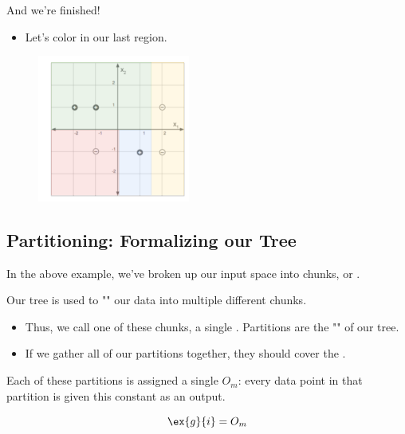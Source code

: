         And we're finished! 

        \begin{itemize}
            \item Let's color in our last region.
        \end{itemize}

        \begin{figure}[H]
            \centering
            \includegraphics[width=50mm,scale=0.5]{images/nonparametric_images/full_tree.png}
        \end{figure}

        





    \phantom{}

    \subsection{Partitioning: Formalizing our Tree}

        In the above example, we've broken up our input space into chunks, or .\\

        \begin{definition}
            Our tree is used to "" our data into multiple different chunks. 

            \begin{itemize}
                \item Thus, we call one of these chunks, a single . Partitions are the "" of our tree.
                \item If we gather all of our partitions together, they should cover the .
            \end{itemize}

            Each of these partitions is assigned a single  $O_m$: every data point in that partition is given this constant as an output.

            \begin{equation*}
                \ex{g}{i} = O_m
            \end{equation*}
        \end{definition}

